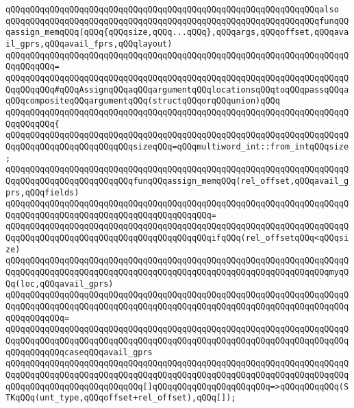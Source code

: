 \newline
\verb|qQQqqQQqqQQqqQQqqQQqqQQqqQQqqQQqqQQqqQQqqQQqqQQqqQQqqQQqqQQqqQQqalso|\newline
\verb|qQQqqQQqqQQqqQQqqQQqqQQqqQQqqQQqqQQqqQQqqQQqqQQqqQQqqQQqqQQqqQQqfunqQQqassign_memqQQq(qQQq{qQQqsize,qQQq...qQQq},qQQqargs,qQQqoffset,qQQqavail_gprs,qQQqavail_fprs,qQQqlayout)|\newline
\verb|qQQqqQQqqQQqqQQqqQQqqQQqqQQqqQQqqQQqqQQqqQQqqQQqqQQqqQQqqQQqqQQqqQQqqQQqqQQqqQQq=|\newline
\verb|qQQqqQQqqQQqqQQqqQQqqQQqqQQqqQQqqQQqqQQqqQQqqQQqqQQqqQQqqQQqqQQqqQQqqQQqqQQqqQQq#qQQqAssignqQQqaqQQqargumentqQQqlocationsqQQqtoqQQqpassqQQqaqQQqcompositeqQQqargumentqQQq(structqQQqorqQQqunion)qQQq|\newline
\verb|qQQqqQQqqQQqqQQqqQQqqQQqqQQqqQQqqQQqqQQqqQQqqQQqqQQqqQQqqQQqqQQqqQQqqQQqqQQqqQQq{|\newline
\verb|qQQqqQQqqQQqqQQqqQQqqQQqqQQqqQQqqQQqqQQqqQQqqQQqqQQqqQQqqQQqqQQqqQQqqQQqqQQqqQQqqQQqqQQqqQQqqQQqsizeqQQq=qQQqmultiword_int::from_intqQQqsize;|\newline
\newline
\verb|qQQqqQQqqQQqqQQqqQQqqQQqqQQqqQQqqQQqqQQqqQQqqQQqqQQqqQQqqQQqqQQqqQQqqQQqqQQqqQQqqQQqqQQqqQQqqQQqfunqQQqassign_memqQQq(rel_offset,qQQqavail_gprs,qQQqfields)|\newline
\verb|qQQqqQQqqQQqqQQqqQQqqQQqqQQqqQQqqQQqqQQqqQQqqQQqqQQqqQQqqQQqqQQqqQQqqQQqqQQqqQQqqQQqqQQqqQQqqQQqqQQqqQQqqQQqqQQq=|\newline
\verb|qQQqqQQqqQQqqQQqqQQqqQQqqQQqqQQqqQQqqQQqqQQqqQQqqQQqqQQqqQQqqQQqqQQqqQQqqQQqqQQqqQQqqQQqqQQqqQQqqQQqqQQqqQQqqQQqifqQQq(rel_offsetqQQq<qQQqsize)|\newline
\newline
\verb|qQQqqQQqqQQqqQQqqQQqqQQqqQQqqQQqqQQqqQQqqQQqqQQqqQQqqQQqqQQqqQQqqQQqqQQqqQQqqQQqqQQqqQQqqQQqqQQqqQQqqQQqqQQqqQQqqQQqqQQqqQQqqQQqqQQqqQQqmyqQQq(loc,qQQqavail_gprs)|\newline
\verb|qQQqqQQqqQQqqQQqqQQqqQQqqQQqqQQqqQQqqQQqqQQqqQQqqQQqqQQqqQQqqQQqqQQqqQQqqQQqqQQqqQQqqQQqqQQqqQQqqQQqqQQqqQQqqQQqqQQqqQQqqQQqqQQqqQQqqQQqqQQqqQQqqQQqqQQq=|\newline
\verb|qQQqqQQqqQQqqQQqqQQqqQQqqQQqqQQqqQQqqQQqqQQqqQQqqQQqqQQqqQQqqQQqqQQqqQQqqQQqqQQqqQQqqQQqqQQqqQQqqQQqqQQqqQQqqQQqqQQqqQQqqQQqqQQqqQQqqQQqqQQqqQQqqQQqqQQqcaseqQQqavail_gprs|\newline
\newline
\verb|qQQqqQQqqQQqqQQqqQQqqQQqqQQqqQQqqQQqqQQqqQQqqQQqqQQqqQQqqQQqqQQqqQQqqQQqqQQqqQQqqQQqqQQqqQQqqQQqqQQqqQQqqQQqqQQqqQQqqQQqqQQqqQQqqQQqqQQqqQQqqQQqqQQqqQQqqQQqqQQqqQQqqQQq[]qQQqqQQqqQQqqQQqqQQqqQQq=>qQQqqQQqqQQq(STKqQQq(unt_type,qQQqoffset+rel_offset),qQQq[]);|\newline
